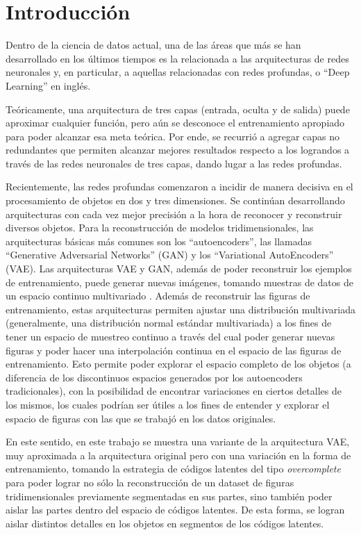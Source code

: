 \documentclass[12pt, spanish]{article}
\begin{document}




\section{Introducción}

Dentro de la ciencia de datos actual, una de las áreas que más se
han desarrollado en los últimos tiempos es la relacionada a las
arquitecturas de redes neuronales y, en particular, a aquellas relacionadas
con redes profundas, o ``Deep Learning'' en inglés.

Teóricamente, una arquitectura de tres capas (entrada, oculta
y de salida) puede aproximar cualquier función, pero aún se desconoce
el entrenamiento apropiado para poder alcanzar esa meta teórica.
Por ende, se recurrió a agregar capas no redundantes que permiten
alcanzar mejores resultados respecto a los lograndos a través
de las redes neuronales de tres capas, dando lugar a las redes
profundas.

Recientemente, las redes profundas comenzaron a incidir de manera decisiva en el procesamiento
de objetos en dos y tres dimensiones. Se continúan desarrollando arquitecturas 
con cada vez mejor precisión a la hora de reconocer
y reconstruir diversos objetos. Para la reconstrucción
de modelos tridimensionales, las arquitecturas básicas más comunes son los ``autoencoders'',
las llamadas ``Generative Adversarial Networks'' (GAN) y los ``Variational
AutoEncoders'' (VAE). Las arquitecturas VAE y GAN,
además de poder reconstruir los ejemplos de entrenamiento,
puede generar nuevas imágenes, tomando muestras de datos de
un espacio continuo multivariado \cite{Karras2018}. Además de
reconstruir las figuras de entrenamiento, estas arquitecturas permiten ajustar una distribución
multivariada (generalmente, una distribución normal estándar multivariada)
a los fines de tener un espacio de muestreo continuo a través del cual poder generar
nuevas figuras y poder hacer una interpolación continua en el espacio de
las figuras de entrenamiento. Esto permite poder explorar el espacio completo de
los objetos (a diferencia de los discontinuos espacios generados por los 
autoencoders tradicionales), con la posibilidad de encontrar variaciones en ciertos detalles
de los mismos, los cuales podrían ser útiles a los fines de entender y explorar el espacio
de figuras con las que se trabajó en los datos originales.

En este sentido, en este trabajo se muestra una variante de la arquitectura VAE, muy
aproximada a la arquitectura original pero con una variación en la forma de entrenamiento,
tomando la estrategia de códigos latentes del tipo \textit{overcomplete} \cite{Yin2019} para poder lograr no
sólo la reconstrucción de un dataset de figuras tridimensionales previamente segmentadas
en sus partes, sino también poder aislar las partes dentro del espacio de códigos latentes.
De esta forma, se logran aislar distintos detalles en los objetos en segmentos de los códigos
latentes.
\end{document}
